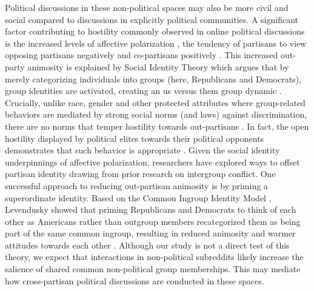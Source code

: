 \documentclass[letterpaper]{article} %
\begin{document}
Political discussions in these non-political spaces may also be more civil and social compared to discussions in explicitly political communities. A significant factor contributing to hostility commonly observed in online political discussions is the increased levels of affective polarization \cite{hutchens2019reinforcing}, the tendency of partisans to view opposing partisans negatively and co-partisans positively \cite{iyengar2015fear}. This increased out-party animosity is explained by Social Identity Theory which argues that by merely categorizing individuals into groups (here, Republicans and Democrats), group identities are activated, creating an us versus them group dynamic \cite{tajfel1979integrative}. Crucially, unlike race, gender and other protected attributes where group-related behaviors are mediated by strong social norms (and laws) against discrimination, there are no norms that temper hostility towards out-partisans \cite{iyengar2019origins}. In fact, the open hostility displayed by political elites towards their political opponents demonstrates that such behavior is appropriate \cite{banda2018elite}. Given the social identity underpinnings of affective polarization, researchers have explored ways to offset partisan identity drawing from prior research on intergroup conflict. One successful approach to reducing out-partisan animosity is by priming a superordinate identity. Based on the Common Ingroup Identity Model \cite{gaertner2011common}, Levendusky showed that priming Republicans and Democrats to think of each other as Americans rather than outgroup members recategorized them as being part of the same common ingroup, resulting in reduced animosity and warmer attitudes towards each other \cite{levendusky2018americans}.  Although our study is not a direct test of this theory, we expect that interactions in non-political subreddits likely increase the salience of shared common non-political group memberships. This may mediate how cross-partisan political discussions are conducted in these spaces.
\end{document}
